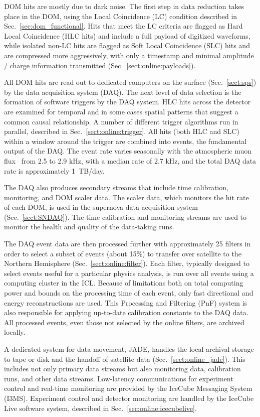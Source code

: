 DOM hits are mostly due to dark noise. The first step
in data reduction takes place in the DOM, using the Local Coincidence (LC) condition described in
Sec.~\ref{sec:dom_functional}.  Hits that meet the LC criteria are flagged
as Hard Local Coincidence (HLC hits) and include a full payload of
digitized waveforms, while isolated non-LC hits are flagged as Soft Local
Coincidence (SLC) hits and are compressed more aggressively, with only a
timestamp and minimal amplitude / charge information transmitted
(Sec.~\ref{sect:online:payloads}). 

All DOM hits are read out to dedicated computers on the surface
(Sec.~\ref{sect:sps}) by the data acquisition system (DAQ).  The next level
of data selection is the formation of software triggers by the DAQ
system. HLC hits across the detector are examined 
for temporal and in some cases spatial patterns that suggest a common
causal relationship.  A number of different trigger algorithms run in
parallel, described in Sec.~\ref{sect:online:trigger}.  All hits (both HLC
and SLC) within a window around the trigger are combined into events, the
fundamental output of the DAQ.  The event rate varies
seasonally with the atmospheric muon flux~\cite{ICECUBE:IceTop} from 2.5 to
2.9 kHz, with a median rate of 2.7 kHz, and the total DAQ data rate is
approximately 1~TB/day. 

The DAQ also produces secondary streams that include time calibration,
monitoring, and DOM scaler data.  The scaler data, which monitors the
hit rate of each DOM, is used in the supernova data
acquisition system (Sec.~\ref{sect:SNDAQ}).  The time calibration and
monitoring streams are used to monitor the health and quality of the
data-taking runs.

The DAQ event data are then processed further with approximately 25 filters
in order to select a subset of events (about 15\%) to transfer over
satellite to the Northern Hemisphere (Sec.~\ref{sect:online:filter}).  Each
filter, typically designed to select events useful for a particular physics
analysis, is run over all events using a computing cluster in the ICL.
Because of limitations both on total computing power and bounds on the
processing time of each event, only fast directional and energy
reconstructions are used.  This Processing and Filtering (PnF) system is
also responsible for applying up-to-date calibration constants to the DAQ
data. All processed events, even those not selected by the online filters,
are archived locally.

A dedicated system for data movement, JADE, handles the local archival storage to
tape or disk and the handoff of satellite data
(Sec.~\ref{sect:online_jade}).  This includes not only primary data streams
but also monitoring data, calibration runs, and other data streams.
Low-latency communications for experiment control and real-time monitoring
are provided by the IceCube Messaging System (I3MS).  
Experiment control and detector monitoring are handled by the IceCube Live
software system, described in Sec.~\ref{sec:online:icecubelive}.

